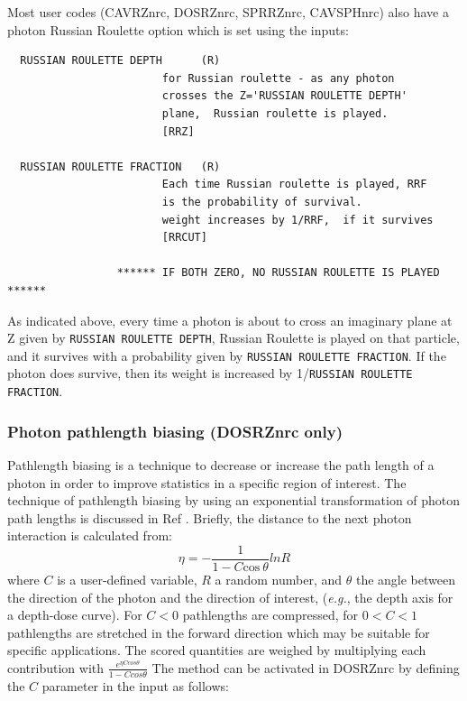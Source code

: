 \documentclass[12pt,twoside]{article}  %
\begin{document}
Most user codes (CAVRZnrc, DOSRZnrc, SPRRZnrc, CAVSPHnrc)
also have a photon Russian Roulette option which is
set using the inputs:

\begin{verbatim}
  RUSSIAN ROULETTE DEPTH      (R)
                        for Russian roulette - as any photon
                        crosses the Z='RUSSIAN ROULETTE DEPTH'
                        plane,  Russian roulette is played.
                        [RRZ]

  RUSSIAN ROULETTE FRACTION   (R)
                        Each time Russian roulette is played, RRF
                        is the probability of survival.
                        weight increases by 1/RRF,  if it survives
                        [RRCUT]

                 ****** IF BOTH ZERO, NO RUSSIAN ROULETTE IS PLAYED ******
\end{verbatim}

As indicated above, every time a photon is about to cross an imaginary
plane
at Z given by {\tt RUSSIAN ROULETTE DEPTH}, Russian Roulette is
played on that particle, and it survives with a probability given
by {\tt RUSSIAN ROULETTE FRACTION}.  If the photon does survive, then
its weight is increased by 1/{\tt RUSSIAN ROULETTE FRACTION}.

\subsubsection{Photon pathlength biasing (DOSRZnrc only)}

Pathlength biasing is a technique to decrease or increase
the path length of a photon in order to improve statistics in
a specific region of interest. The technique of pathlength
biasing by using an exponential transformation of photon path
lengths is discussed in Ref \cite{RB90}. Briefly, the distance to
the next photon interaction is calculated from:
\begin{equation}
\eta = - \frac{1}{1 - C \mbox{cos}~ \theta} ln R
\end{equation}
where $C$ is a user-defined variable, $R$ a random number, and $\theta$
the angle between the direction of the photon and the direction of
interest, ({\em e.g.}, the depth axis for a depth-dose curve).
For $C < 0$ pathlengths are compressed, for $0 < C < 1$ pathlengths
are stretched in the forward direction which may be suitable for
specific applications. The scored quantities are weighed by
multiplying each contribution with
$\frac{e^{\eta C cos \theta}}{1 - C cos \theta}$
The method can be
activated in DOSRZnrc
by defining the $C$ parameter in the input as follows:
\end{document}
